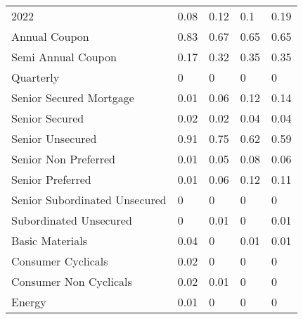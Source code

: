 \begin{table}[H]
\begin{tabular}{lllll}
2022 & \cellcolor[HTML]{EFF7F4}0.08 & \cellcolor[HTML]{E8F4EE}0.12 & \cellcolor[HTML]{ECF6F1}0.1 & \cellcolor[HTML]{DDF0E4}0.19 \\
Annual Coupon & \cellcolor[HTML]{71C487}0.83 & \cellcolor[HTML]{8CCF9E}0.67 & \cellcolor[HTML]{8FD0A1}0.65 & \cellcolor[HTML]{8FD0A1}0.65 \\
Semi Annual   Coupon & \cellcolor[HTML]{E0F1E7}0.17 & \cellcolor[HTML]{C7E7D1}0.32 & \cellcolor[HTML]{C2E5CD}0.35 & \cellcolor[HTML]{C2E5CD}0.35 \\
Quarterly & \cellcolor[HTML]{FCFCFF}0 & \cellcolor[HTML]{FCFCFF}0 & \cellcolor[HTML]{FCFCFF}0 & \cellcolor[HTML]{FCFCFF}0 \\
Senior   Secured Mortgage & \cellcolor[HTML]{FBFCFE}0.01 & \cellcolor[HTML]{F2F8F7}0.06 & \cellcolor[HTML]{E8F4EE}0.12 & \cellcolor[HTML]{E5F3EB}0.14 \\
Senior Secured & \cellcolor[HTML]{F9FBFD}0.02 & \cellcolor[HTML]{F9FBFD}0.02 & \cellcolor[HTML]{F6FAFA}0.04 & \cellcolor[HTML]{F6FAFA}0.04 \\
Senior Unsecured & \cellcolor[HTML]{63BE7B}0.91 & \cellcolor[HTML]{7EC993}0.75 & \cellcolor[HTML]{94D2A6}0.62 & \cellcolor[HTML]{99D4AA}0.59 \\
Senior Non   Preferred & \cellcolor[HTML]{FBFCFE}0.01 & \cellcolor[HTML]{F4F9F8}0.05 & \cellcolor[HTML]{EFF7F4}0.08 & \cellcolor[HTML]{F2F8F7}0.06 \\
Senior Preferred & \cellcolor[HTML]{FBFCFE}0.01 & \cellcolor[HTML]{F2F8F7}0.06 & \cellcolor[HTML]{E8F4EE}0.12 & \cellcolor[HTML]{EAF5F0}0.11 \\
Senior   Subordinated Unsecured & \cellcolor[HTML]{FCFCFF}0 & \cellcolor[HTML]{FCFCFF}0 & \cellcolor[HTML]{FCFCFF}0 & \cellcolor[HTML]{FCFCFF}0 \\
Subordinated   Unsecured & \cellcolor[HTML]{FCFCFF}0 & \cellcolor[HTML]{FBFCFE}0.01 & \cellcolor[HTML]{FCFCFF}0 & \cellcolor[HTML]{FBFCFE}0.01 \\
Basic Materials & \cellcolor[HTML]{F6FAFA}0.04 & \cellcolor[HTML]{FCFCFF}0 & \cellcolor[HTML]{FBFCFE}0.01 & \cellcolor[HTML]{FBFCFE}0.01 \\
Consumer   Cyclicals & \cellcolor[HTML]{F9FBFD}0.02 & \cellcolor[HTML]{FCFCFF}0 & \cellcolor[HTML]{FCFCFF}0 & \cellcolor[HTML]{FCFCFF}0 \\
Consumer   Non Cyclicals & \cellcolor[HTML]{F9FBFD}0.02 & \cellcolor[HTML]{FBFCFE}0.01 & \cellcolor[HTML]{FCFCFF}0 & \cellcolor[HTML]{FCFCFF}0 \\
Energy & \cellcolor[HTML]{FBFCFE}0.01 & \cellcolor[HTML]{FCFCFF}0 & \cellcolor[HTML]{FCFCFF}0 & \cellcolor[HTML]{FCFCFF}0 \\

\end{tabular}
\end{table}
